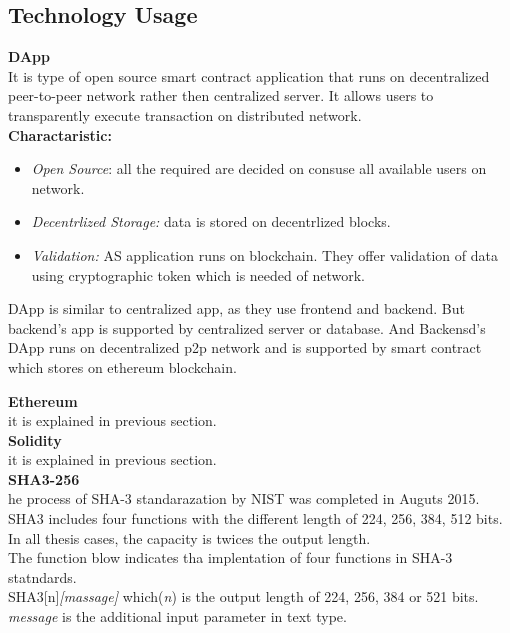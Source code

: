 \subsection{Technology Usage}
\textbf{DApp} \\
It is type of open source smart contract application that runs on decentralized peer-to-peer network rather then centralized server.
It allows users to transparently execute transaction on distributed network. \\
\textbf{Charactaristic:}
\begin{itemize}
	\item \textit{Open Source}: all the required are decided on consuse all available users on network.
	\item \textit{Decentrlized Storage: } data is stored on decentrlized blocks.
	\item \textit{Validation: } AS application runs on blockchain. They offer validation of data using cryptographic token which is needed of network. 
	
\end{itemize}
DApp is similar to centralized app, as they use frontend and backend. But backend's app is supported by centralized server or database. And Backensd's DApp runs on decentralized p2p network and is supported by smart contract which stores on ethereum blockchain.
  
\textbf{Ethereum} \\
it is explained in previous section.\\
\textbf{Solidity} \\
it is explained in previous section.\\
\textbf{SHA3-256} \\he process of SHA-3 standarazation by NIST was completed in Auguts 2015. SHA3 includes four functions with the different length of 224, 256, 384, 512 bits.
In all thesis cases, the capacity is twices the output length. \\
The function blow indicates tha implentation of four functions in SHA-3 statndards.\\
SHA3[n]\textit{[massage]} which(\textit{n}) is the output length of 224, 256, 384 or 521 bits.\\
\textit{message} is the additional input parameter in text type.

